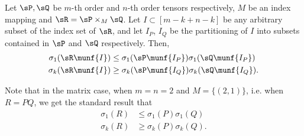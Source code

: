 \begin{theorem}
  \label{thm:tensor-multiplication}
Let $\sP, \sQ$ be $m$-th order and $n$-th order tensors respectively, $M$ be an
  index mapping and $\sR = \sP \times_M \sQ$. 
Let $I \subset [m - k + n - k]$ be any arbitrary subset of the index set
  of $\sR$,
and let $I_P$, $I_Q$ be the partitioning of $I$ into subsets contained
  in $\sP$ and $\sQ$ respectively.
Then,
\begin{align*}
\sigma_{1}(\sR\munf{I}) &\le \sigma_{1}(\sP\munf{I_P}) \sigma_{1}(\sQ\munf{I_P}) \\
\sigma_{k}(\sR\munf{I}) &\ge \sigma_{k}(\sP\munf{I_Q}) \sigma_{k}(\sQ\munf{I_Q}).
\end{align*}
\end{theorem}

Note that in the matrix case, when $m = n = 2$ and $M=\{(2,1)\}$, i.e.
when $R = P Q$, we get the standard result that 
\begin{align}
\sigma_{1}(R) &\le \sigma_{1}(P) \sigma_{1}(Q) \\
\sigma_{k}(R) &\ge \sigma_{k}(P) \sigma_{k}(Q) \label{eqn:matrix-singular}.
\end{align}

